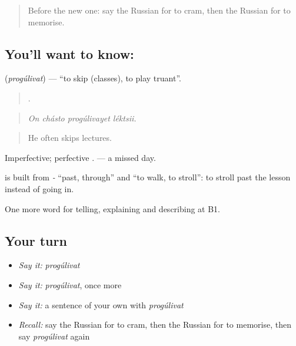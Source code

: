 \label{lesson:RU-C384-progulivat}



\begin{quote}
Before the new one: say the Russian for to cram, then the Russian for to memorise.
\end{quote}

\subsection*{You'll want to know: }
\textbf{} (\emph{progúlivat}) — \textquotedblleft{}to skip (classes), to play truant\textquotedblright{}.

\begin{quote}
   .
\end{quote}

\begin{quote}
\emph{On chásto progúlivayet léktsii.}
\end{quote}

\begin{quote}
He often skips lectures.
\end{quote}

Imperfective; perfective \emph{}. \emph{} — a missed day.

\begin{cousinweb}
\textbf{} is built from \emph{-} \textquotedblleft{}past, through\textquotedblright{} and \emph{} \textquotedblleft{}to walk, to stroll\textquotedblright{}: to stroll past the lesson instead of going in.
\end{cousinweb}

\begin{grammarlens}[title={What you've built}]
One more word for telling, explaining and describing at B1.
\end{grammarlens}

\subsection*{Your turn}
\begin{itemize}
\raggedright
  \item \emph{Say it:} \emph{progúlivat}
  \item \emph{Say it:} \emph{progúlivat}, once more
  \item \emph{Say it:} a sentence of your own with \emph{progúlivat}
  \item \emph{Recall:} say the Russian for to cram, then the Russian for to memorise, then say \emph{progúlivat} again
\end{itemize}


